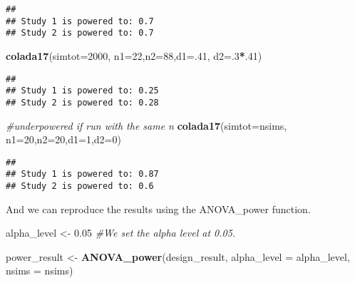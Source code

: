 \documentclass[]{article}
\newenvironment{Shaded}{\begin{snugshade}}{\end{snugshade}}
\newcommand{\KeywordTok}[1]{\textcolor[rgb]{0.13,0.29,0.53}{\textbf{#1}}}
\newcommand{\DataTypeTok}[1]{\textcolor[rgb]{0.13,0.29,0.53}{#1}}
\newcommand{\DecValTok}[1]{\textcolor[rgb]{0.00,0.00,0.81}{#1}}
\newcommand{\FloatTok}[1]{\textcolor[rgb]{0.00,0.00,0.81}{#1}}
\newcommand{\StringTok}[1]{\textcolor[rgb]{0.31,0.60,0.02}{#1}}
\newcommand{\CommentTok}[1]{\textcolor[rgb]{0.56,0.35,0.01}{\textit{#1}}}
\newcommand{\OperatorTok}[1]{\textcolor[rgb]{0.81,0.36,0.00}{\textbf{#1}}}
\newcommand{\NormalTok}[1]{#1}
\begin{document}
\begin{verbatim}
## 
## Study 1 is powered to: 0.7
## Study 2 is powered to: 0.7
\end{verbatim}

\begin{Shaded}
\begin{Highlighting}[]
  \KeywordTok{colada17}\NormalTok{(}\DataTypeTok{simtot=}\DecValTok{2000}\NormalTok{, }\DataTypeTok{n1=}\DecValTok{22}\NormalTok{,}\DataTypeTok{n2=}\DecValTok{88}\NormalTok{,}\DataTypeTok{d1=}\NormalTok{.}\DecValTok{41}\NormalTok{, }\DataTypeTok{d2=}\NormalTok{.}\DecValTok{3}\OperatorTok{*}\NormalTok{.}\DecValTok{41}\NormalTok{)}
\end{Highlighting}
\end{Shaded}

\begin{verbatim}
## 
## Study 1 is powered to: 0.25
## Study 2 is powered to: 0.28
\end{verbatim}

\begin{Shaded}
\begin{Highlighting}[]
\CommentTok{#underpowered if run with the same n}
\KeywordTok{colada17}\NormalTok{(}\DataTypeTok{simtot=}\NormalTok{nsims, }\DataTypeTok{n1=}\DecValTok{20}\NormalTok{,}\DataTypeTok{n2=}\DecValTok{20}\NormalTok{,}\DataTypeTok{d1=}\DecValTok{1}\NormalTok{,}\DataTypeTok{d2=}\DecValTok{0}\NormalTok{)  }
\end{Highlighting}
\end{Shaded}

\begin{verbatim}
## 
## Study 1 is powered to: 0.87
## Study 2 is powered to: 0.6
\end{verbatim}

And we can reproduce the results using the ANOVA\_power function.

\begin{Shaded}
\begin{Highlighting}[]
\NormalTok{alpha_level <-}\StringTok{ }\FloatTok{0.05} \CommentTok{#We set the alpha level at 0.05. }

\NormalTok{power_result <-}\StringTok{ }\KeywordTok{ANOVA_power}\NormalTok{(design_result, }\DataTypeTok{alpha_level =}\NormalTok{ alpha_level, }\DataTypeTok{nsims =}\NormalTok{ nsims)}
\end{Highlighting}
\end{Shaded}
\end{document}
